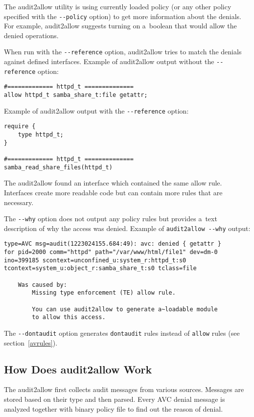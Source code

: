 The audit2allow utility is using currently loaded policy (or any other policy
specified with the \texttt{-{}-policy} option) to get more information about the
denials. For example, audit2allow suggests turning on a~boolean that would allow
the denied operations.

When run with the \texttt{-{}-reference} option, audit2allow tries to match the
denials against defined interfaces. Example of audit2allow output without the
\texttt{-{}-reference} option:
\begin{lstlisting}
#============= httpd_t ==============
allow httpd_t samba_share_t:file getattr;
\end{lstlisting}
Example of audit2allow output with the \texttt{-{}-reference} option:
\begin{lstlisting}
require {
	type httpd_t;
}

#============= httpd_t ==============
samba_read_share_files(httpd_t)
\end{lstlisting}
The audit2allow found an interface which contained the same allow rule.
Interfaces create more readable code but can contain more rules that are
necessary.

The \texttt{-{}-why} option does not output any policy rules but provides a~text
description of why the access was denied. Example of \texttt{audit2allow
-{}-why} output:
\begin{lstlisting}
type=AVC msg=audit(1223024155.684:49): avc: denied { getattr }
for pid=2000 comm="httpd" path="/var/www/html/file1" dev=dm-0
ino=399185 scontext=unconfined_u:system_r:httpd_t:s0
tcontext=system_u:object_r:samba_share_t:s0 tclass=file

    Was caused by:
        Missing type enforcement (TE) allow rule.

        You can use audit2allow to generate a~loadable module
        to allow this access.
\end{lstlisting}

The \texttt{-{}-dontaudit} option generates \texttt{dontaudit} rules instead of
\texttt{allow} rules (see section~\ref{avrules}).

\subsection{How Does audit2allow Work}
The audit2allow first collects audit messages from various sources. Messages are
stored based on their type and then parsed. Every AVC denial message is analyzed
together with binary policy file to find out the reason of denial.

